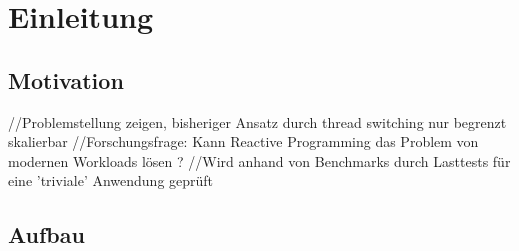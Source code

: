 \section{Einleitung}
\label{sec:einleitung}

\subsection{Motivation}
\label{subsec:motivation}
//Problemstellung zeigen, bisheriger Ansatz durch thread switching nur begrenzt skalierbar
//Forschungsfrage: Kann Reactive Programming das Problem von modernen Workloads lösen ?
//Wird anhand  von Benchmarks durch Lasttests für eine 'triviale' Anwendung geprüft
\subsection{Aufbau}
\label{subsec:aufbau}